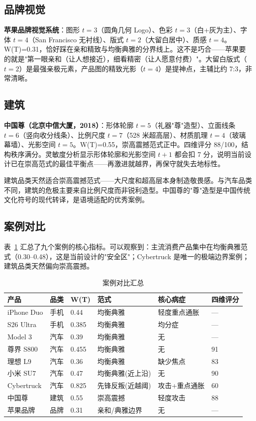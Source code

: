 \documentclass[10pt,a4paper]{article}
\begin{document}
\subsection{品牌视觉}

\textbf{苹果品牌视觉系统}：图形 $t=3$（圆角几何 Logo）、色彩 $t=3$（白+灰为主）、字体 $t=4$（San Francisco 无衬线）、版式 $t=2$（大留白居中）、质感 $t=4$。W(T)=0.31，恰好踩在亲和精致与均衡典雅的分界线上。这不是巧合——苹果要的就是"第一眼亲和（让人想接近），细看精密（让人愿意付费）"。大留白版式（$t=2$）是最强亲极元素，产品图的精致光影（$t=4$）是提神点，主辅比约 7:3，非常清晰。

\subsection{建筑}

\textbf{中国尊（北京中信大厦，2018）}：形体轮廓 $t=5$（礼器"尊"造型）、立面线条 $t=6$（竖向收分线条）、比例尺度 $t=7$（528 米超高层）、材质肌理 $t=4$（玻璃幕墙）、光影空间 $t=5$。W(T)=0.55，崇高震撼范式正中。四维评分 88/100，结构秩序满分。灵敏度分析显示形体轮廓和光影空间 $t+1$ 都会扣 7 分，说明当前设计已在崇高范式的最佳平衡点——再激进就越界，再保守就失去地标性。

建筑品类天然适合崇高震撼范式——大尺度和超高层本身制造敬畏感。与汽车品类不同，建筑的危极主要来自比例尺度而非锐利造型。中国尊的"尊"造型是中国传统文化符号的现代转译，是语境适配的优秀案例。

\subsection{案例对比}

表~\ref{tab:casecompare} 汇总了九个案例的核心指标。可以观察到：主流消费产品集中在均衡典雅范式（0.30--0.48），这是当前设计的"安全区"；Cybertruck 是唯一的极端边界案例；建筑品类天然偏向崇高震撼。

\begin{table}[H]
\centering
\caption{案例对比汇总}
\label{tab:casecompare}
\begin{tabular}{p{2.5cm}p{1.2cm}p{1.2cm}p{2cm}p{2.5cm}p{1.5cm}}
\toprule
\textbf{产品} & \textbf{品类} & \textbf{W(T)} & \textbf{范式} & \textbf{核心病症} & \textbf{四维评分} \\
\midrule
iPhone Duo & 手机 & 0.44 & 均衡典雅 & 轻度重点通胀 & — \\
S26 Ultra & 手机 & 0.385 & 均衡典雅 & 均分症 & — \\
Model 3 & 汽车 & 0.39 & 均衡典雅 & 无 & — \\
尊界 S800 & 汽车 & 0.455 & 均衡典雅 & 无 & 91 \\
理想 L9 & 汽车 & 0.36 & 均衡典雅 & 缺少焦点 & 83 \\
小米 SU7 & 汽车 & 0.47 & 均衡典雅(近上沿) & 无 & 90 \\
Cybertruck & 汽车 & 0.825 & 先锋反叛(近越阈) & 攻击+重点通胀 & 60 \\
中国尊 & 建筑 & 0.55 & 崇高震撼 & 轻度攻击 & 88 \\
苹果品牌 & 品牌 & 0.31 & 亲和/典雅边界 & 无 & — \\
\bottomrule
\end{tabular}
\end{table}
\end{document}
